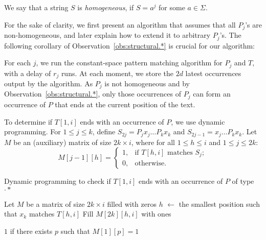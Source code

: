 \documentclass{article}
\begin{document}

\begin{definition}
We say that a string $S$ is \emph{homogeneous}, if $S = a^j$ for some $a \in \Sigma$.
\end{definition}

For the sake of clarity, we first present an algorithm that assumes that all $P_j$'s are non-homogeneous, and later explain how to extend it to arbitrary $P_j$'s. The following corollary of Observation~\ref{obs:structural.*} is crucial for our algorithm:

For each $j$, we run the constant-space pattern matching algorithm for $P_j$ and $T$, with a delay of $r_j$ runs. At each moment, we store the $2d$ latest occurrences output by the algorithm. As $P_j$ is not homogeneous and by Observation~\ref{obs:structural.*}, only those occurrences of $P_j$ can form an occurrence of $P$ that ends at the current position of the text. 

To determine if $T[1,i]$ ends with an occurrence of $P$, we use dynamic programming. For $1 \le j \le k$, define $S_{2j} = P_j x_{j} \ldots P_k x_{k}$ and $S_{2j-1} = x_{j} \ldots P_k x_{k}$. Let $M$ be an (auxiliary) matrix of size $2k \times i$, where for all $1\le h \le i$ and $1 \leq j \leq 2k$: 
$$
M[j-1][h] = 
\begin{cases}
1, & \text{if } T[h,i] \text{ matches } S_j;\\
0, & \text{otherwise}. 
\end{cases}
$$
 
\begin{algorithm}[ht]
\caption{Dynamic programming to check if $T[1,i]$ ends with an occurrence of $P$ of type $\cdot*$}
 Let $M$ be a matrix of size $2k \times i$ filled with zeros\;
$h$ $\leftarrow$ the smallest position such that $x_k$ matches $T[h,i]$\;
Fill $M[2k][h,i]$ with ones\;

\noindent\Return $1$ if there exists $p$ such that $M[1][p] = 1$\;
\label{alg:dynprog.*}
\end{algorithm}
\end{document}
